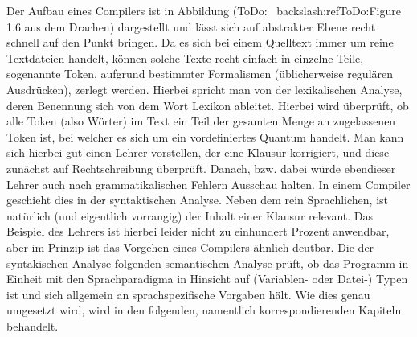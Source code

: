 \documentclass{standalone}
\begin{document}
Der Aufbau eines Compilers ist in Abbildung (ToDo: ~backslash:ref{ToDo:Figure 1.6 aus dem Drachen}) dargestellt und lässt sich auf abstrakter Ebene recht schnell auf den Punkt bringen. Da es sich bei einem Quelltext immer um reine Textdateien handelt, können solche Texte recht einfach in einzelne Teile, sogenannte Token, aufgrund bestimmter Formalismen (üblicherweise regulären Ausdrücken), zerlegt werden. Hierbei spricht man von der lexikalischen Analyse, deren Benennung sich von dem Wort Lexikon ableitet. 
Hierbei wird überprüft, ob alle Token (also Wörter) im Text ein Teil der gesamten Menge an zugelassenen Token ist, bei welcher es sich um ein vordefiniertes Quantum handelt. Man kann sich hierbei gut einen Lehrer vorstellen, der eine Klausur korrigiert, und diese zunächst auf Rechtschreibung überprüft. Danach, bzw. dabei würde ebendieser Lehrer auch nach grammatikalischen Fehlern Ausschau halten. In einem Compiler geschieht dies in der syntaktischen Analyse. Neben dem rein Sprachlichen, ist natürlich (und eigentlich vorrangig) der Inhalt einer Klausur relevant. Das Beispiel des Lehrers ist hierbei leider nicht zu einhundert Prozent anwendbar, aber im Prinzip ist das Vorgehen eines Compilers ähnlich deutbar. Die der syntakischen Analyse folgenden semantischen Analyse prüft, ob das Programm in Einheit mit den Sprachparadigma in Hinsicht auf (Variablen- oder Datei-) Typen ist und sich allgemein an sprachspezifische Vorgaben hält. Wie dies genau umgesetzt wird, wird in den folgenden, namentlich korrespondierenden Kapiteln behandelt. 

\end{document}
